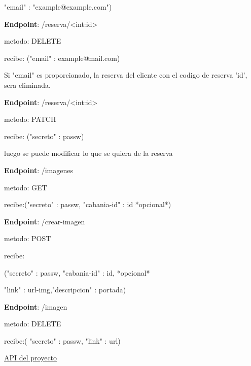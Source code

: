 "email" : "example@example.com")


\textbf{Endpoint}: /reserva/<int:id>

metodo: DELETE

recibe:
("email" : example@mail.com)

Si "email" es proporcionado, la reserva del cliente con el codigo de reserva 'id', sera eliminada.


\textbf{Endpoint}: /reserva/<int:id>

metodo: PATCH

recibe: ("secreto" : passw)

luego se puede modificar lo que se quiera de la reserva


\textbf{Endpoint}: /imagenes

metodo: GET

recibe:("secreto" : passw, "cabania-id" : id *opcional*)

\textbf{Endpoint}: /crear-imagen

metodo: POST

recibe:

("secreto" : passw, "cabania-id" : id, *opcional*

"link" : url-img,"descripcion" : portada)

\textbf{Endpoint}: /imagen

metodo: DELETE

recibe:( "secreto" : passw, "link" : url)

\href{https://github.com/MaxiFttInst/UBA_TP_IDS/blob/api/api/app.py}{API del proyecto}



























